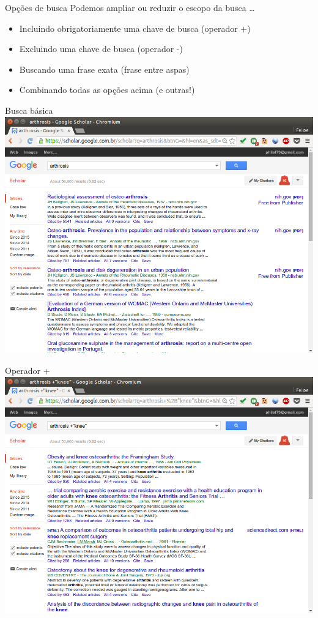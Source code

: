 \documentclass{beamer}
\begin{document}
\begin{frame}{Opções de busca}
  Podemos ampliar ou reduzir o escopo da busca \ldots
  \begin{itemize}
  \item Incluindo obrigatoriamente uma chave de busca (operador +)
  \item Excluindo uma chave de busca (operador -)
  \item Buscando uma frase exata (frase entre aspas)
  \item Combinando todas as opções acima (e outras!)
  \end{itemize}
\end{frame}

\begin{frame}{Busca básica}
  \includegraphics[height=.85\textheight]{Busca/google-fu-basico}
\end{frame}

\begin{frame}{Operador +}
  \includegraphics[height=.85\textheight]{Busca/google-fu-plus}
\end{frame}
\end{document}

